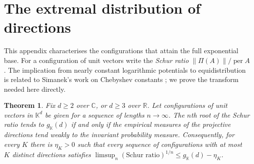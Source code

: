 \documentclass[11pt,a4paper]{article}
\newtheorem{theorem}{Theorem}[section]
\theoremstyle{remark}
\newcommand{\per}{\operatorname{per}}
\newcommand{\norm}[1]{\left\lVert#1\right\rVert}
\newcommand{\C}{\mathbb C}
\newcommand{\R}{\mathbb R}
\newcommand{\K}{\mathbb K}
\begin{document}
\appendix
\section{The extremal distribution of directions}\label{app:rigidity}
This appendix characterises the configurations that attain the full exponential base. For a configuration of unit vectors write the \emph{Schur ratio} $\norm{\Pi(A)}/\per A$. The implication from nearly constant logarithmic potentials to equidistribution is related to Simanek's work on Chebyshev constants \cite{Simanek}; we prove the transform needed here directly.

\begin{theorem}\label{thm:rigidity}
Fix $d\ge2$ over $\C$, or $d\ge3$ over $\R$. Let configurations of unit vectors in $\K^d$ be given for a sequence of lengths $n\to\infty$. The $n$th root of the Schur ratio tends to $g_\K(d)$ if and only if the empirical measures of the projective directions tend weakly to the invariant probability measure. Consequently, for every $K$ there is $\eta_K>0$ such that every sequence of configurations with at most $K$ distinct directions satisfies $\limsup_n(\text{Schur ratio})^{1/n}\le g_\K(d)-\eta_K$.
\end{theorem}
\end{document}
